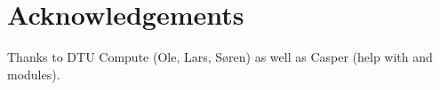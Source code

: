 \section{Acknowledgements}
\label{sec:acknowledgements}

Thanks to DTU Compute (Ole, Lars, Søren) as well as Casper (help with  and  modules).
